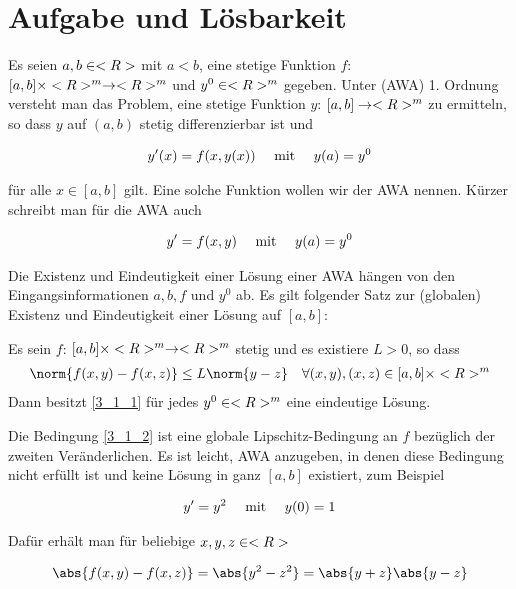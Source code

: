 \section{Aufgabe und Lösbarkeit}

Es seien $a,b \in \R$ mit $a < b$, eine stetige Funktion $f$: $[a,b] \times \R^m \to \R^m$ und $y^0 \in \R^m$ gegeben. Unter  (AWA) 1. Ordnung versteht man das Problem, eine stetige Funktion $y$: $[a,b] \to \R^m$ zu ermitteln, so dass $y$ auf $(a,b)$ stetig differenzierbar ist und

\begin{align}
	y'(x) = f(x,y(x)) \quad \mit \quad y(a)=y^0 \notag
\end{align}

für alle $x \in [a,b]$ gilt. Eine solche Funktion wollen wir  der AWA nennen. Kürzer schreibt man für die AWA auch

\begin{align}
	\label{3_1_1}
	y'=f(x,y) \quad \mit \quad y(a)=y^0
\end{align}

Die Existenz und Eindeutigkeit einer Lösung einer AWA hängen von den Eingangsinformationen $a,b,f$ und $y^0$ ab. Es gilt folgender Satz zur (globalen) Existenz und Eindeutigkeit einer Lösung auf $[a,b]$:

\begin{proposition}
	Es sein $f$: $[a,b] \times \R^m \to \R^m$ stetig und es existiere $L>0$, so dass
	\begin{align}
		\label{3_1_2}
		\norm{f(x,y)-f(x,z)} \le L \norm{y-z} \quad \forall (x,y),(x,z) \in [a,b] \times \R^m
	\end{align}
	Dann besitzt \cref{3_1_1} für jedes $y^0 \in \R^m$ eine eindeutige Lösung.
\end{proposition}

Die Bedingung \cref{3_1_2} ist eine globale Lipschitz-Bedingung an $f$ bezüglich der zweiten Veränderlichen. Es ist leicht, AWA anzugeben, in denen diese Bedingung nicht erfüllt ist und keine Lösung in ganz $[a,b]$ existiert, zum Beispiel

\begin{align}
	y'= y^2 \quad \mit \quad y(0) = 1 \notag
\end{align}

Dafür erhält man für beliebige $x,y,z \in \R$

\begin{align}
	\abs{f(x,y) - f(x,z)} = \abs{y^2 - z^2} = \abs{y+z} \abs{y-z} \notag
\end{align}

